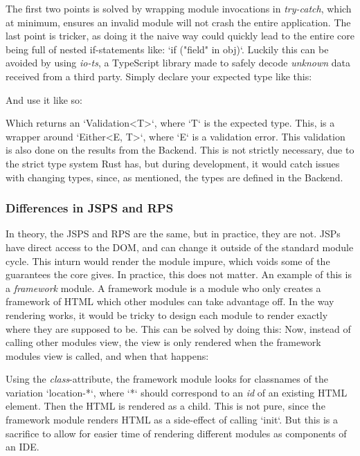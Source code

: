 \documentclass[runningheads]{llncs}
\begin{document}
The first two points is solved by wrapping module invocations in
\textit{try-catch}, which at minimum, ensures an invalid module will not crash
the entire application. The last point is tricker, as doing it the naive way
could quickly lead to the entire core being full of nested if-statements like:
`if ("field" in obj)`. Luckily this can be avoided by using \textit{io-ts}, a
TypeScript library made to safely decode \textit{unknown} data received from a
third party.
Simply declare your expected type like this: %

And use it like so: %

Which returns an `Validation<T>`, where `T` is the expected type. This, is a
wrapper around `Either<E, T>`, where `E` is a validation error. This validation
is also done on the results from the Backend.
This is not strictly necessary, due to the strict type system Rust has, but
during development, it would catch issues with changing types, since, as
mentioned, the types are defined in the Backend.

\subsubsection{Differences in JSPS and RPS}
In theory, the JSPS and RPS are the same, but in practice, they are not. JSPs
have direct access to the DOM, and can change it outside of the standard module
cycle. This inturn would render the module impure, which voids some of the
guarantees the core gives.
In practice, this does not matter. An example of this is a \textit{framework}
module. A framework module is a module who only creates a framework of HTML
which other modules can take advantage off.
In the way rendering works, it would be tricky to design each module to render
exactly where they are supposed to be. This can be solved by doing this:
Now, instead of calling other modules view, the view is only rendered when the
framework modules view is called, and when that happens:

Using the \textit{class}-attribute, the framework module looks for classnames of
the variation `location-*`, where `*` should correspond to an \textit{id} of an
existing HTML element. Then the HTML is rendered as a child. This is not pure,
since the framework module renders HTML as a side-effect of calling `init`. But
this is a sacrifice to allow for easier time of rendering different modules as
components of an IDE.
\end{document}
